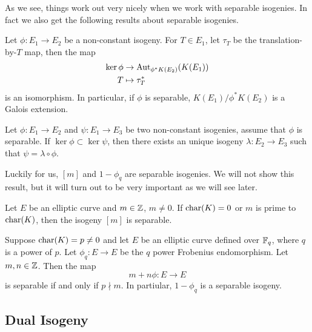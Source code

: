 As we see, things work out very nicely when we work with separable isogenies.
In fact we also get the following results about separable isogenies.

\begin{proposition}
	Let $\phi: E_1 \to E_2$ be a non-constant isogeny.
	For $T \in E_1$, let $\tau_T$ be the translation-by-$T$ map,
	then the map
	\begin{align*}
		\ker \phi &\to \operatorname{Aut}_{\phi^*K(E_2)}(K(E_1))\\
		T &\mapsto \tau_T^*
	\end{align*}
	is an isomorphism. In particular, if $\phi$ is separable,
	$K(E_1)/\phi^*K(E_2)$ is a Galois extension.
\end{proposition}


\begin{proposition}
	Let $\phi: E_1 \to E_2$ and $\psi: E_1 \to E_3$ be two non-constant
	isogenies, assume that $\phi$ is separable.
	If $\ker\phi \subset \ker \psi$, then there exists an unique isogeny
	$\lambda: E_2 \to E_3$ such that $\psi = \lambda \circ \phi$.
\end{proposition}

Luckily for us, $[m]$ and $1 - \phi_q$ are separable isogenies. We will
not show this result, but it will turn out to be very important as we will see
later.


\begin{proposition}
	\label{prop:m-separable}
	Let $E$ be an elliptic curve and $m \in \mathbb{Z}$, $m \neq 0$.
	If $\operatorname{char}(K) = 0$ or $m$ is prime to $\operatorname{char}(K)$, then the
	isogeny $[m]$ is separable.
\end{proposition}

\begin{proposition}
	\label{prop:frobenius-separable}
	Suppose $\operatorname{char}(K) = p \neq 0$ and
	let $E$ be an elliptic curve defined over
	$\mathbb{F}_q$, where $q$ is a power of $p$. 
	Let $\phi_q: E \to E$ be the
	$q$ power Frobenius endomorphism.
	Let $m, n \in \mathbb{Z}$.
	Then the map
	\begin{equation*}
		m + n\phi: E\to E
	\end{equation*}
	is separable if and only if $p\nmid m$.
	In partiular, $1 - \phi_q$ is a separable isogeny.
\end{proposition}

\subsection{Dual Isogeny}

